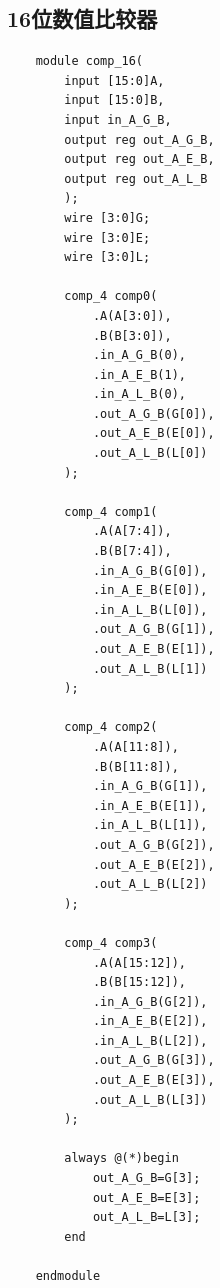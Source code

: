 \documentclass[fontset=windows,12pt]{article}
\begin{document}
    \subsection{16位数值比较器}
    {\setmainfont{Courier New Bold} 
    \begin{lstlisting}
    module comp_16(
        input [15:0]A,
        input [15:0]B,
        input in_A_G_B,
        output reg out_A_G_B,
        output reg out_A_E_B,
        output reg out_A_L_B
        );
        wire [3:0]G;
        wire [3:0]E;
        wire [3:0]L;
        
        comp_4 comp0(
            .A(A[3:0]),
            .B(B[3:0]),
            .in_A_G_B(0),
            .in_A_E_B(1),
            .in_A_L_B(0),
            .out_A_G_B(G[0]),
            .out_A_E_B(E[0]),
            .out_A_L_B(L[0])
        );   
        
        comp_4 comp1(
            .A(A[7:4]),
            .B(B[7:4]),
            .in_A_G_B(G[0]),
            .in_A_E_B(E[0]),
            .in_A_L_B(L[0]),
            .out_A_G_B(G[1]),
            .out_A_E_B(E[1]),
            .out_A_L_B(L[1])
        ); 
        
        comp_4 comp2(
            .A(A[11:8]),
            .B(B[11:8]),
            .in_A_G_B(G[1]),
            .in_A_E_B(E[1]),
            .in_A_L_B(L[1]),
            .out_A_G_B(G[2]),
            .out_A_E_B(E[2]),
            .out_A_L_B(L[2])
        ); 
        
        comp_4 comp3(
            .A(A[15:12]),
            .B(B[15:12]),
            .in_A_G_B(G[2]),
            .in_A_E_B(E[2]),
            .in_A_L_B(L[2]),
            .out_A_G_B(G[3]),
            .out_A_E_B(E[3]),
            .out_A_L_B(L[3])
        ); 
        
        always @(*)begin
            out_A_G_B=G[3];
            out_A_E_B=E[3];
            out_A_L_B=L[3];
        end
        
    endmodule
    \end{lstlisting}}
\end{document}
